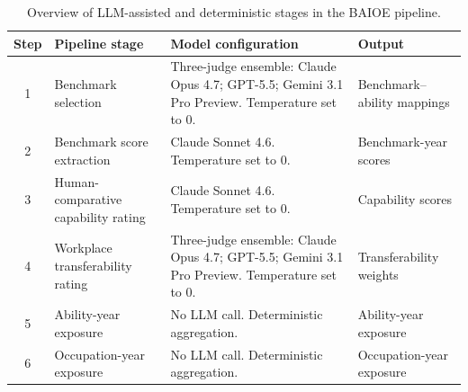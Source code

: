 \begin{table}[htbp]\centering
\caption{Overview of LLM-assisted and deterministic stages in the BAIOE pipeline.}\label{tab:stages}
\begin{tabular}{clp{7cm}l}\toprule
Step & Pipeline stage & Model configuration & Output \\ \midrule
1 & Benchmark selection & Three-judge ensemble: Claude Opus 4.7; GPT-5.5; Gemini 3.1 Pro Preview. Temperature set to 0. & Benchmark--ability mappings \\
2 & Benchmark score extraction & Claude Sonnet 4.6. Temperature set to 0. & Benchmark-year scores \\
3 & Human-comparative capability rating & Claude Sonnet 4.6. Temperature set to 0. & Capability scores \\
4 & Workplace transferability rating & Three-judge ensemble: Claude Opus 4.7; GPT-5.5; Gemini 3.1 Pro Preview. Temperature set to 0. & Transferability weights \\
5 & Ability-year exposure & No LLM call. Deterministic aggregation. & Ability-year exposure \\
6 & Occupation-year exposure & No LLM call. Deterministic aggregation. & Occupation-year exposure \\
\bottomrule\end{tabular}\end{table}
